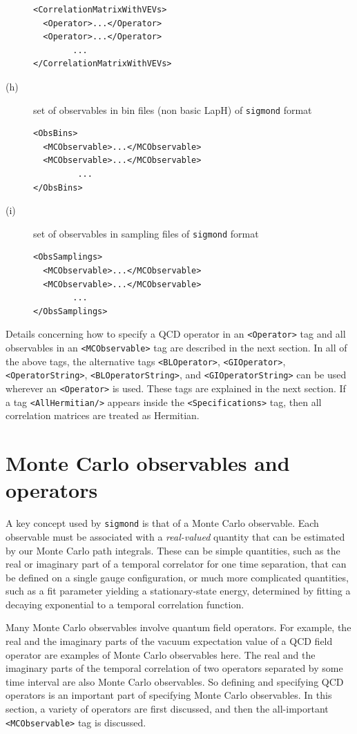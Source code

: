 \documentclass[12pt]{article}
\newcommand{\vb}{\texttt}
\begin{document}
\begin{description}
\begin{verbatim}
<CorrelationMatrixWithVEVs>
  <Operator>...</Operator>
  <Operator>...</Operator>
        ...
</CorrelationMatrixWithVEVs>
\end{verbatim}
\item[(h)]
  set of observables in bin files (non basic LapH) of \vb{sigmond} format
\begin{verbatim}
<ObsBins>
  <MCObservable>...</MCObservable>
  <MCObservable>...</MCObservable>
         ...
</ObsBins>
\end{verbatim}
\item[(i)]
  set of observables in sampling files of \vb{sigmond} format
\begin{verbatim}
<ObsSamplings>
  <MCObservable>...</MCObservable>
  <MCObservable>...</MCObservable>
        ...
</ObsSamplings>
\end{verbatim}
\end{description}

Details concerning how to specify a QCD operator in an \vb{<Operator>}
tag and all observables in an \vb{<MCObservable>} tag are described in the
next section.  In all of the above tags, the alternative tags \vb{<BLOperator>},
\vb{<GIOperator>}, \vb{<OperatorString>}, \vb{<BLOperatorString>}, and
\vb{<GIOperatorString>} can be used wherever an \vb{<Operator>} is used.
These tags are explained in the next section.
If a tag \vb{<AllHermitian/>} appears inside the \vb{<Specifications>}
tag, then all correlation matrices are treated as Hermitian.

\section{Monte Carlo observables and operators}

A key concept used by \vb{sigmond} is that of a Monte Carlo observable.
Each observable must be associated with a \textit{real-valued} quantity that
can be estimated by our Monte Carlo path integrals.  These can be simple
quantities, such as the real or imaginary part of a temporal correlator for
one time separation, that can be defined on a single gauge configuration,
or much more complicated quantities, such as a fit parameter yielding a
stationary-state energy, determined by fitting a decaying exponential to a
temporal correlation function.

Many Monte Carlo observables involve quantum field operators.  For example,
the real and the imaginary parts of the vacuum expectation value of a QCD
field operator are examples of Monte Carlo observables here.  The real
and the imaginary parts of the temporal correlation of two operators
separated by some time interval are also Monte Carlo observables.  So
defining and specifying QCD operators is an important part of specifying
Monte Carlo observables.  In this section, a variety of operators are
first discussed, and then the all-important \vb{<MCObservable>} tag is
discussed.
\end{document}
